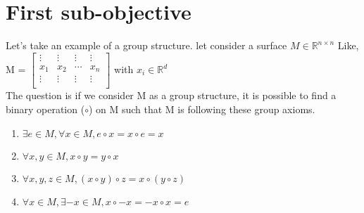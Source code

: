 \documentclass{report}
\begin{document}
        \section{First sub-objective}
            Let's take an example of a group structure.
            let consider a surface $M \in \mathbb{R}^{n \times n}$
            Like, M =  $\begin{bmatrix}
                \vdots & \vdots & \vdots &\vdots \\
                x_{1} & x_{2} & \cdots & x_{n} \\
                \vdots & \vdots & \vdots &\vdots \\
            \end{bmatrix}$   with $x_{i} \in \mathbb{R}^{d}$ \\
    The question is if we consider M as a group structure, it is possible to find a binary operation ($\circ$) on M such that M is following these group axioms.
    \begin{enumerate}
        \item $\exists e \in M, \forall x \in M, e \circ x = x \circ e = x$
        \item $\forall{} x,y \in{} M, x \circ y = y \circ x$
        \item $\forall x,y,z \in M, (x \circ y) \circ z = x \circ (y \circ z)$
        \item $\forall x \in M, \exists -x \in M, x \circ -x = -x \circ x = e$
    \end{enumerate}

\end{document}
